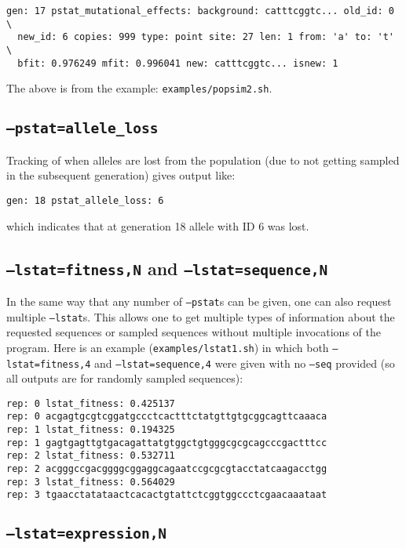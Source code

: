 \documentclass[11pt]{article}
\begin{document}
\begin{verbatim}
gen: 17 pstat_mutational_effects: background: catttcggtc... old_id: 0 \
  new_id: 6 copies: 999 type: point site: 27 len: 1 from: 'a' to: 't' \
  bfit: 0.976249 mfit: 0.996041 new: catttcggtc... isnew: 1
\end{verbatim}

\noindent The above is from the example: \texttt{examples/popsim2.sh}.

\subsection{\texttt{--pstat=allele\_loss}}

Tracking of when alleles are lost from the population (due to not getting sampled in the subsequent generation) gives output like:

\begin{verbatim}
gen: 18 pstat_allele_loss: 6
\end{verbatim}

\noindent which indicates that at generation 18 allele with ID 6 was lost.

\subsection{\texttt{--lstat=fitness,N} and \texttt{--lstat=sequence,N}}

In the same way that any number of \texttt{--pstat}s can be given, one can also request multiple \texttt{--lstat}s. This allows one to get multiple types of information about the requested sequences or sampled sequences without multiple invocations of the program. Here is an example (\texttt{examples/lstat1.sh}) in which both \texttt{--lstat=fitness,4} and \texttt{--lstat=sequence,4} were given with no \texttt{--seq} provided (so all outputs are for randomly sampled sequences):

\begin{verbatim}
rep: 0 lstat_fitness: 0.425137
rep: 0 acgagtgcgtcggatgccctcactttctatgttgtgcggcagttcaaaca
rep: 1 lstat_fitness: 0.194325
rep: 1 gagtgagttgtgacagattatgtggctgtgggcgcgcagcccgactttcc
rep: 2 lstat_fitness: 0.532711
rep: 2 acgggccgacggggcggaggcagaatccgcgcgtacctatcaagacctgg
rep: 3 lstat_fitness: 0.564029
rep: 3 tgaacctatataactcacactgtattctcggtggccctcgaacaaataat
\end{verbatim}

\subsection{\texttt{--lstat=expression,N}}
\end{document}
